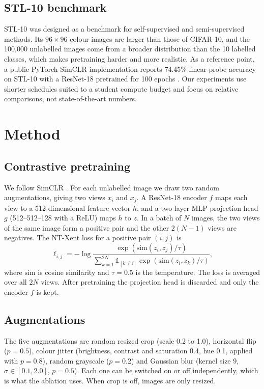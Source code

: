 \documentclass[11pt,a4paper]{article}
\begin{document}
\subsection{STL-10 benchmark}
STL-10 \citep{coates2011} was designed as a benchmark for self-supervised and semi-supervised methods. Its
$96\times96$ colour images are larger than those of CIFAR-10, and the 100,000 unlabelled images come from a
broader distribution than the 10 labelled classes, which makes pretraining harder and more realistic. As a
reference point, a public PyTorch SimCLR implementation reports 74.45\% linear-probe accuracy on STL-10 with a
ResNet-18 pretrained for 100 epochs \citep{silva2020}. Our experiments use shorter schedules suited to a
student compute budget and focus on relative comparisons, not state-of-the-art numbers.

\section{Method}\label{sec:method}

\subsection{Contrastive pretraining}
We follow SimCLR \citep{chen2020}. For each unlabelled image we draw two random augmentations, giving two views
$x_i$ and $x_j$. A ResNet-18 encoder $f$ maps each view to a 512-dimensional feature vector $h$, and a two-layer
MLP projection head $g$ (512--512--128 with a ReLU) maps $h$ to $z$. In a batch of $N$ images, the two views of
the same image form a positive pair and the other $2(N-1)$ views are negatives. The NT-Xent loss for a positive
pair $(i,j)$ is
\begin{equation}
  \ell_{i,j} = -\log \frac{\exp(\mathrm{sim}(z_i, z_j)/\tau)}{\sum_{k=1}^{2N} \mathbb{1}_{[k \neq i]}\exp(\mathrm{sim}(z_i, z_k)/\tau)},
\end{equation}
where $\mathrm{sim}$ is cosine similarity and $\tau = 0.5$ is the temperature. The loss is averaged over all
$2N$ views. After pretraining the projection head is discarded and only the encoder $f$ is kept.

\subsection{Augmentations}
The five augmentations are random resized crop (scale 0.2 to 1.0), horizontal flip ($p=0.5$), colour jitter
(brightness, contrast and saturation 0.4, hue 0.1, applied with $p=0.8$), random grayscale ($p=0.2$) and
Gaussian blur (kernel size 9, $\sigma \in [0.1, 2.0]$, $p=0.5$). Each one can be switched on or off
independently, which is what the ablation uses. When crop is off, images are only resized.
\end{document}
